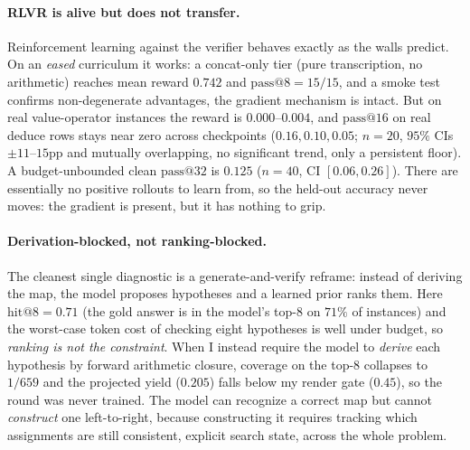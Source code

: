 \documentclass[11pt]{article}
\begin{document}
\paragraph{RLVR is alive but does not transfer.} Reinforcement learning against the
verifier behaves exactly as the walls predict. On an \emph{eased} curriculum it works: a
concat-only tier (pure transcription, no arithmetic) reaches mean reward $0.742$ and
$\mathrm{pass@}8 = 15/15$, and a smoke test confirms non-degenerate advantages, the
gradient mechanism is intact. But on real value-operator instances the reward is
$0.000$--$0.004$, and $\mathrm{pass@}16$ on real deduce rows stays near zero across
checkpoints ($0.16, 0.10, 0.05$; $n{=}20$, $95\%$ CIs $\pm 11$--$15$pp and mutually
overlapping, no significant trend, only a persistent floor). A budget-unbounded clean
$\mathrm{pass@}32$ is $0.125$ ($n{=}40$, CI $[0.06,0.26]$). There are essentially no positive
rollouts to learn from, so the held-out accuracy never moves: the gradient is present, but it
has nothing to grip.

\paragraph{Derivation-blocked, not ranking-blocked.} The cleanest single diagnostic is a
generate-and-verify reframe: instead of deriving the map, the model proposes hypotheses and
a learned prior ranks them. Here $\mathrm{hit@}8 = 0.71$ (the gold answer is in the model's
top-8 on $71\%$ of instances) and the worst-case token cost of checking eight hypotheses is
well under budget, so \emph{ranking is not the constraint}. When I instead require the
model to \emph{derive} each hypothesis by forward arithmetic closure, coverage on the
top-8 collapses to $1/659$ and the projected yield ($0.205$) falls below my render gate
($0.45$), so the round was never trained. The model can recognize a correct map but cannot
\emph{construct} one left-to-right, because constructing it requires tracking which
assignments are still consistent, explicit search state, across the whole problem.
\end{document}
